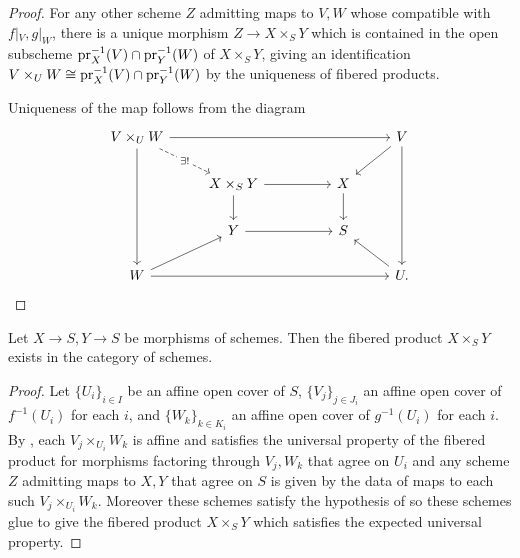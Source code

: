 \begin{proof}
    For any other scheme $Z$ admitting maps to $V,W$ whose compatible with $f|_{V},g|_{W}$, there is a unique morphism $Z\to X\times_{S}Y$ which is contained in the open subscheme $\mathrm{pr}_{X}^{-1}(V)\cap\mathrm{pr}_{Y}^{-1}(W)$ of $X\times_{S}Y$, giving an identification $V\times_{U}W\cong\mathrm{pr}_{X}^{-1}(V)\cap\mathrm{pr}_{Y}^{-1}(W)$ by the uniqueness of fibered products. 

    Uniqueness of the map follows from the diagram 
    $$%
    \begin{tikzcd}
        {V\times_{U}W} &&&& V \\
        & {X\times_{S}Y} && X \\
        & Y && S \\
        W &&&& U.
        \arrow[from=1-1, to=1-5]
        \arrow["{\exists!}"{description}, dashed, from=1-1, to=2-2]
        \arrow[from=1-1, to=4-1]
        \arrow[from=1-5, to=2-4]
        \arrow[from=1-5, to=4-5]
        \arrow[from=2-2, to=2-4]
        \arrow[from=2-2, to=3-2]
        \arrow[from=2-4, to=3-4]
        \arrow[from=3-2, to=3-4]
        \arrow[from=4-1, to=3-2]
        \arrow[from=4-1, to=4-5]
        \arrow[from=4-5, to=3-4]
    \end{tikzcd}$$
\end{proof}
\begin{proposition}\label{prop: fibered products exist}
    Let $X\to S, Y\to S$ be morphisms of schemes. Then the fibered product $X\times_{S}Y$ exists in the category of schemes. 
\end{proposition}
\begin{proof}
    Let $\{U_{i}\}_{i\in I}$ be an affine open cover of $S$, $\{V_{j}\}_{j\in J_{i}}$ an affine open cover of $f^{-1}(U_{i})$ for each $i$, and $\{W_{k}\}_{k\in K_{i}}$ an affine open cover of $g^{-1}(U_{i})$ for each $i$. By , each $V_{j}\times_{U_{i}}W_{k}$ is affine and satisfies the universal property of the fibered product for morphisms factoring through $V_{j},W_{k}$ that agree on $U_{i}$ and any scheme $Z$ admitting maps to $X,Y$ that agree on $S$ is given by the data of maps to each such $V_{j}\times_{U_{i}}W_{k}$. Moreover these schemes satisfy the hypothesis of  so these schemes glue to give the fibered product $X\times_{S}Y$ which satisfies the expected universal property. 
\end{proof}
